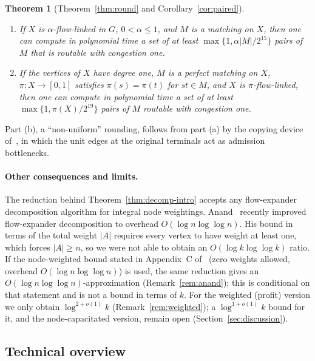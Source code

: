 \documentclass[11pt,letterpaper]{article}
\newtheorem{theorem}{Theorem}[section]
\theoremstyle{definition}
\begin{document}
\begin{theorem}[Theorem~\ref{thm:round} and Corollary~\ref{cor:paired}]\label{thm:round-intro}
\begin{enumerate}[label=(\alph*),nosep]
\item If $X$ is $\alpha$-flow-linked in $G$, $0<\alpha\le1$, and $M$ is a matching on $X$,
then one can compute in polynomial time a set of at least $\max\{1,\alpha|M|/2^{15}\}$ pairs of
$M$ that is routable with congestion one.
\item If the vertices of $X$ have degree one, $M$ is a perfect matching on $X$,
$\pi:X\to[0,1]$ satisfies $\pi(s)=\pi(t)$ for $st\in M$, and $X$ is $\pi$-flow-linked, then
one can compute in polynomial time a set of at least $\max\{1,\pi(X)/2^{19}\}$ pairs of $M$
routable with congestion one.
\end{enumerate}
\end{theorem}

Part (b), a ``non-uniform'' rounding, follows from part (a) by the copying device
of~\cite[Lemma~1.1]{CKS05}, in which the unit edges at the original terminals act as admission
bottlenecks.

\paragraph{Other consequences and limits.}
The reduction behind Theorem~\ref{thm:decomp-intro} accepts any flow-expander decomposition
algorithm for integral node weightings. Anand~\cite{Anand26} recently improved flow-expander
decomposition to overhead $O(\log n\log\log n)$. His bound in terms of the total weight $|A|$
requires every vertex to have weight at least one, which forces $|A|\ge n$, so we were not able
to obtain an $O(\log k\log\log k)$ ratio. If the node-weighted bound stated in Appendix~C
of~\cite{Anand26} (zero weights allowed, overhead $O(\log n\log\log n)$) is used, the same
reduction gives an $O(\log n\log\log n)$-approximation (Remark~\ref{rem:anand}); this is
conditional on that statement and is not a bound in terms of $k$. For the weighted (profit)
version we only obtain $\log^{2+o(1)}k$ (Remark~\ref{rem:weighted}); a $\log^{1+o(1)}k$ bound
for it, and the node-capacitated version, remain open (Section~\ref{sec:discussion}).

\subsection{Technical overview}
\end{document}
